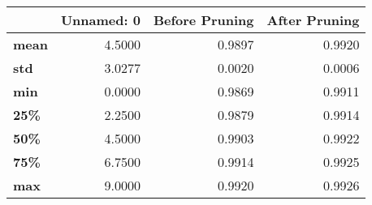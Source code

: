 \begin{tabular}{lrrr}
\toprule
{} &  Unnamed: 0 &  Before Pruning &  After Pruning \\
\midrule
\textbf{mean} &      4.5000 &          0.9897 &         0.9920 \\
\textbf{std } &      3.0277 &          0.0020 &         0.0006 \\
\textbf{min } &      0.0000 &          0.9869 &         0.9911 \\
\textbf{25\% } &      2.2500 &          0.9879 &         0.9914 \\
\textbf{50\% } &      4.5000 &          0.9903 &         0.9922 \\
\textbf{75\% } &      6.7500 &          0.9914 &         0.9925 \\
\textbf{max } &      9.0000 &          0.9920 &         0.9926 \\
\bottomrule
\end{tabular}
